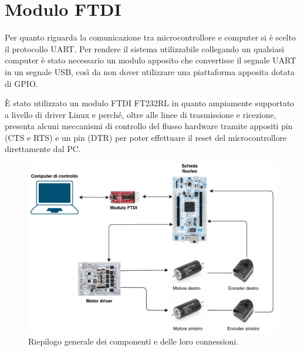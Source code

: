 \section{Modulo FTDI}
Per quanto riguarda la comunicazione tra microcontrollore e computer si è scelto il protocollo UART. 
Per rendere il sistema utilizzabile collegando un qualsiasi computer è stato necessario un modulo apposito che convertisse il segnale UART in un segnale USB, così da non dover utilizzare una piattaforma apposita dotata di GPIO.

È stato utilizzato un modulo FTDI FT232RL in quanto ampiamente supportato a livello di driver Linux e perché, oltre alle linee di trasmissione e ricezione, presenta alcuni meccanismi di controllo del flusso hardware tramite appositi pin (CTS e RTS) e un pin (DTR) per poter effettuare il reset del microcontrollore direttamente dal PC.


\begin{figure}[H]
\centering
\includegraphics[width=\textwidth]{images/infrastruttura.pdf}
\caption{Riepilogo generale dei componenti e delle loro connessioni.}
\end{figure}

